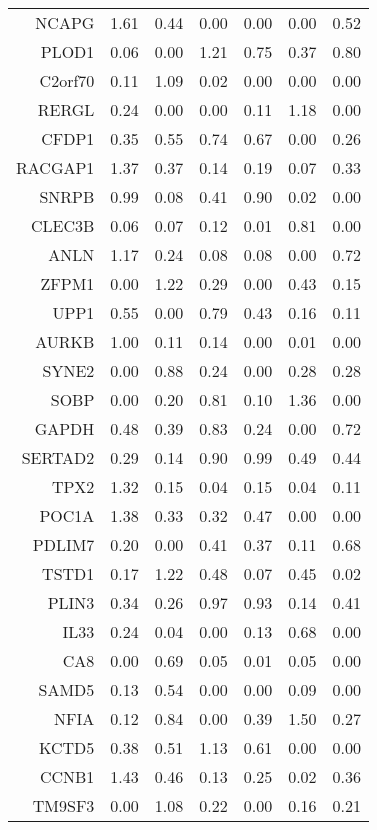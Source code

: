\begin{longtable}{rrrrrrr}
  NCAPG & 1.61 & 0.44 & 0.00 & 0.00 & 0.00 & 0.52 \\ 
  PLOD1 & 0.06 & 0.00 & 1.21 & 0.75 & 0.37 & 0.80 \\ 
  C2orf70 & 0.11 & 1.09 & 0.02 & 0.00 & 0.00 & 0.00 \\ 
  RERGL & 0.24 & 0.00 & 0.00 & 0.11 & 1.18 & 0.00 \\ 
  CFDP1 & 0.35 & 0.55 & 0.74 & 0.67 & 0.00 & 0.26 \\ 
  RACGAP1 & 1.37 & 0.37 & 0.14 & 0.19 & 0.07 & 0.33 \\ 
  SNRPB & 0.99 & 0.08 & 0.41 & 0.90 & 0.02 & 0.00 \\ 
  CLEC3B & 0.06 & 0.07 & 0.12 & 0.01 & 0.81 & 0.00 \\ 
  ANLN & 1.17 & 0.24 & 0.08 & 0.08 & 0.00 & 0.72 \\ 
  ZFPM1 & 0.00 & 1.22 & 0.29 & 0.00 & 0.43 & 0.15 \\ 
  UPP1 & 0.55 & 0.00 & 0.79 & 0.43 & 0.16 & 0.11 \\ 
  AURKB & 1.00 & 0.11 & 0.14 & 0.00 & 0.01 & 0.00 \\ 
  SYNE2 & 0.00 & 0.88 & 0.24 & 0.00 & 0.28 & 0.28 \\ 
  SOBP & 0.00 & 0.20 & 0.81 & 0.10 & 1.36 & 0.00 \\ 
  GAPDH & 0.48 & 0.39 & 0.83 & 0.24 & 0.00 & 0.72 \\ 
  SERTAD2 & 0.29 & 0.14 & 0.90 & 0.99 & 0.49 & 0.44 \\ 
  TPX2 & 1.32 & 0.15 & 0.04 & 0.15 & 0.04 & 0.11 \\ 
  POC1A & 1.38 & 0.33 & 0.32 & 0.47 & 0.00 & 0.00 \\ 
  PDLIM7 & 0.20 & 0.00 & 0.41 & 0.37 & 0.11 & 0.68 \\ 
  TSTD1 & 0.17 & 1.22 & 0.48 & 0.07 & 0.45 & 0.02 \\ 
  PLIN3 & 0.34 & 0.26 & 0.97 & 0.93 & 0.14 & 0.41 \\ 
  IL33 & 0.24 & 0.04 & 0.00 & 0.13 & 0.68 & 0.00 \\ 
  CA8 & 0.00 & 0.69 & 0.05 & 0.01 & 0.05 & 0.00 \\ 
  SAMD5 & 0.13 & 0.54 & 0.00 & 0.00 & 0.09 & 0.00 \\ 
  NFIA & 0.12 & 0.84 & 0.00 & 0.39 & 1.50 & 0.27 \\ 
  KCTD5 & 0.38 & 0.51 & 1.13 & 0.61 & 0.00 & 0.00 \\ 
  CCNB1 & 1.43 & 0.46 & 0.13 & 0.25 & 0.02 & 0.36 \\ 
  TM9SF3 & 0.00 & 1.08 & 0.22 & 0.00 & 0.16 & 0.21 \\ 

\end{longtable}
